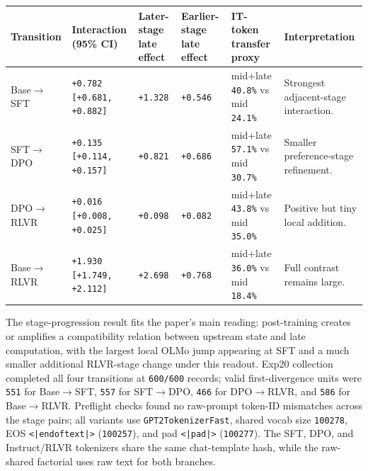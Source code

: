 \documentclass[11pt]{article}
\begin{document}
\begin{table}[t]
\centering
\small
\setlength{\tabcolsep}{3pt}
\begin{tabularx}{\linewidth}{@{}>{\raggedright\arraybackslash}X >{\raggedright\arraybackslash}X >{\raggedright\arraybackslash}X >{\raggedright\arraybackslash}X >{\raggedright\arraybackslash}X >{\raggedright\arraybackslash}X@{}}
\toprule
Transition & Interaction (95\% CI) & Later-stage late effect & Earlier-stage late effect & IT-token transfer proxy & Interpretation \\
\midrule
Base\ensuremath{\to}SFT & \texttt{+0.782} \texttt{[+0.681, +0.882]} & \texttt{+1.328} & \texttt{+0.546} & mid+late \texttt{40.8\%} vs mid \texttt{24.1\%} & Strongest adjacent-stage interaction. \\
SFT\ensuremath{\to}DPO & \texttt{+0.135} \texttt{[+0.114, +0.157]} & \texttt{+0.821} & \texttt{+0.686} & mid+late \texttt{57.1\%} vs mid \texttt{30.7\%} & Smaller preference-stage refinement. \\
DPO\ensuremath{\to}RLVR & \texttt{+0.016} \texttt{[+0.008, +0.025]} & \texttt{+0.098} & \texttt{+0.082} & mid+late \texttt{43.8\%} vs mid \texttt{35.0\%} & Positive but tiny local addition. \\
Base\ensuremath{\to}RLVR & \texttt{+1.930} \texttt{[+1.749, +2.112]} & \texttt{+2.698} & \texttt{+0.768} & mid+late \texttt{36.0\%} vs mid \texttt{18.4\%} & Full contrast remains large. \\
\bottomrule
\end{tabularx}
\end{table}

The stage-progression result fits the paper's main reading: post-training creates or amplifies a compatibility relation between upstream state and late computation, with the largest local OLMo jump appearing at SFT and a much smaller additional RLVR-stage change under this readout. Exp20 collection completed all four transitions at \texttt{600/600} records; valid first-divergence units were \texttt{551} for Base\ensuremath{\to}SFT, \texttt{557} for SFT\ensuremath{\to}DPO, \texttt{466} for DPO\ensuremath{\to}RLVR, and \texttt{586} for Base\ensuremath{\to}RLVR. Preflight checks found no raw-prompt token-ID mismatches across the stage pairs; all variants use \texttt{GPT2TokenizerFast}, shared vocab size \texttt{100278}, EOS \texttt{<|endoftext|>} (\texttt{100257}), and pad \texttt{<|pad|>} (\texttt{100277}). The SFT, DPO, and Instruct/RLVR tokenizers share the same chat-template hash, while the raw-shared factorial uses raw text for both branches.
\end{document}
